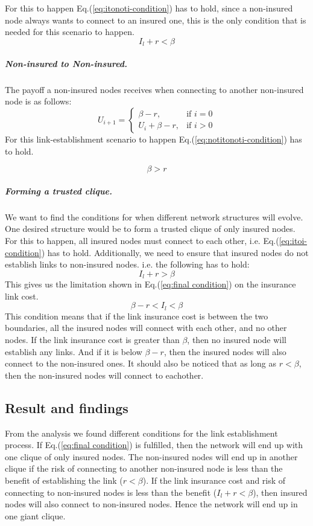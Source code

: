 For this to happen Eq.(\ref{eq:itonoti-condition}) has to hold, since a non-insured node always wants to connect to an insured one, this is the only condition that is needed for this scenario to happen.
\begin{equation}
I_{l}+r<\beta
\label{eq:itonoti-condition}
\end{equation}
\subparagraph{Non-insured to Non-insured.}
The payoff a non-insured nodes receives when connecting to another non-insured node is as follows:
\begin{equation}
    U_{i+1}= 
\begin{cases}
    \beta -r,& \text{if } i = 0\\
    U_{i}+\beta -r,& \text{if }  i>0
   
\end{cases}
\label{eq:notitonotimodel2}
\end{equation}
For this link-establishment scenario to happen Eq.(\ref{eq:notitonoti-condition}) has to hold.

\begin{equation}
\beta>r
\label{eq:notitonoti-condition}
\end{equation}

\subparagraph{Forming a trusted clique.}
We want to find the conditions for when different network structures will evolve. One desired structure would be to form a trusted clique of only insured nodes. For this to happen, all insured nodes must connect to each other, i.e. Eq.(\ref{eq:itoi-condition}) has to hold. Additionally, we need to ensure that insured nodes do not establish links to non-insured nodes. i.e. the following has to hold:
\begin{equation}
I_{l}+r>\beta
\end{equation}
This gives us the limitation shown in Eq.(\ref{eq:final condition}) on the insurance link cost.
\begin{equation}
\beta-r<I_{l}<\beta
\label{eq:final condition}
\end{equation}
This condition means that if the link insurance cost is between the two boundaries, all the insured nodes will connect with each other, and no other nodes. If the link insurance cost is greater than $\beta$, then no insured node will establish any links. And if it is below $\beta-r$, then the insured nodes will also connect to the non-insured ones.
It should also be noticed that as long as $r<\beta$, then the non-insured nodes will connect to eachother. 

\subsection{Result and findings}
From the analysis we found different conditions for the link establishment process. If Eq.(\ref{eq:final condition}) is fulfilled, then the network will end up with one clique of only insured nodes. The non-insured nodes will end up in another clique if the risk of connecting to another non-insured node is less than the benefit of establishing the link ($r<\beta$).
If the link insurance cost and risk of connecting to non-insured nodes is less than the benefit ($I_{l}+r<\beta$), then insured nodes will also connect to non-insured nodes. Hence the network will end up in one giant clique.

